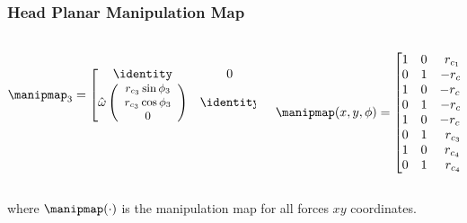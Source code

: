 \begin{frame}
	\frametitle{Head Planar Manipulation Map}
	\begin{columns}[c]
		\begin{column}{0.5\textwidth}
			\small
			\begin{align}
			\manipmap_3 = \begin{bmatrix}
			\identity & 0 \\
			\hat{\omega}
			\small \left(\begin{array}{c}
			r_{c_3} \sin \phi_3 \\ 
			r_{c_3} \cos \phi_3  \\ 
			0 \end{array}\right) & \identity	
			\end{bmatrix}\,
			\left(
			\begin{array}{cc}
			1 & 0 \\
			0 & 1 \\
			0 & 0 \\
			0 & 0 \\
			0 & 0 \\
			0 & 0
			\end{array}\right)\nonumber
			\end{align}			
		\end{column}
		\begin{column}{.5\textwidth}
			\tiny
			\begin{align}
			\manipmap(x, y, \phi) = \begin{bmatrix}
			1 & 0 & r_{c_1} \cos\phi_1 \\ 
			0 & 1 & -r_{c_1} \sin\phi_1 \\ 
			1 & 0 & -r_{c_2} \cos\phi_2 \\ 
			0 & 1 & -r_{c_2} \sin\phi_2 \\
			1 & 0 & -r_{c_3} \cos\phi_3 \\ 
			0 & 1 & r_{c_3} \sin\phi_3 \\	
			1 & 0 & r_{c_4} \cos\phi_4 \\ 
			0 & 1 & r_{c_4} \sin\phi_4
			\end{bmatrix}^T \nonumber
			\end{align}
		\end{column}
	\end{columns}
	where $\manipmap(\cdot)$ is the manipulation map for all forces \wrt  $xy$ coordinates.
\end{frame}

